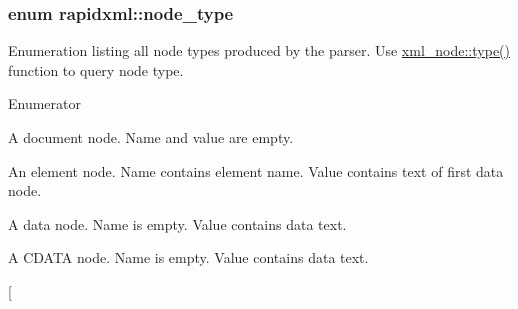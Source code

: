 \subsubsection[{node\+\_\+type}]{\setlength{\rightskip}{0pt plus 5cm}enum {\bf rapidxml\+::node\+\_\+type}}\label{namespacerapidxml_abb456db38f7efb746c4330eed6072a7c}
Enumeration listing all node types produced by the parser. Use \hyperlink{classrapidxml_1_1xml__node_a2c6a4315b98bcfa2e04fed3fa1b22c36}{xml\+\_\+node\+::type()} function to query node type. \begin{Desc}
\item[Enumerator]\par
\begin{description}
\item[{\em 
\hypertarget{namespacerapidxml_abb456db38f7efb746c4330eed6072a7ca4023b6a1c7059fd8fbec2112d5c35424}{}node\+\_\+document\label{namespacerapidxml_abb456db38f7efb746c4330eed6072a7ca4023b6a1c7059fd8fbec2112d5c35424}
}]A document node. Name and value are empty. \item[{\em 
\hypertarget{namespacerapidxml_abb456db38f7efb746c4330eed6072a7ca89cbeb4d28046326e4ee953d3c4047ff}{}node\+\_\+element\label{namespacerapidxml_abb456db38f7efb746c4330eed6072a7ca89cbeb4d28046326e4ee953d3c4047ff}
}]An element node. Name contains element name. Value contains text of first data node. \item[{\em 
\hypertarget{namespacerapidxml_abb456db38f7efb746c4330eed6072a7ca9d669d8e1f4ba9c7eeada4c14a11ad1d}{}node\+\_\+data\label{namespacerapidxml_abb456db38f7efb746c4330eed6072a7ca9d669d8e1f4ba9c7eeada4c14a11ad1d}
}]A data node. Name is empty. Value contains data text. \item[{\em 
\hypertarget{namespacerapidxml_abb456db38f7efb746c4330eed6072a7caccf0b363d3876a3f83ff9b1bcdaaa536}{}node\+\_\+cdata\label{namespacerapidxml_abb456db38f7efb746c4330eed6072a7caccf0b363d3876a3f83ff9b1bcdaaa536}
}]A C\+D\+A\+T\+A node. Name is empty. Value contains data text. \item[{\em 
}
\end{description}
\end{Desc}
